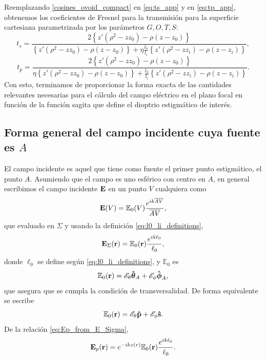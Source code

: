 Reemplazando \eqref{cosines_ovoid_compact} en \eqref{eq:ts_app} y en \eqref{eq:tp_app}, obtenemos los coeficientes de Fresnel para la transmisión para la superficie cartesiana parametrizada por los parámetros $G,O,T,S$:
\begin{equation}
 t_s
 =
 \frac{
 2 \left\{ z'(\rho^2 - zz_0) - \rho(z - z_0) \right\}
 }
 {
 \left\{ z'(\rho^2 - zz_0) - \rho(z - z_0) \right\}
 +
 \eta \frac{l_0}{l_i}
 \left\{ z'(\rho^2 - zz_i) - \rho(z - z_i) \right\}
 },
  \label{eq:t_s_ovoid}
\end{equation}
\begin{equation}
 t_p
 =
 \frac{
 2 \left\{ z'(\rho^2 - zz_0) - \rho(z - z_0) \right\}
 }
 {
 \eta
 \left\{ z'(\rho^2 - zz_0) - \rho(z - z_0) \right\}
 +
 \frac{l_0}{l_i}
 \left\{ z'(\rho^2 - zz_i) - \rho(z - z_i) \right\}
 }.
  \label{eq:t_p_ovoid}
\end{equation}
Con esto, terminamos de proporcionar la forma exacta de las cantidades relevantes necesarias para el cálculo del campo eléctrico en el plano focal en función de la función sagita que define el dioptrio estigmático de interés.

\subsection{Forma general del campo incidente cuya fuente es $A$}
\label{subsec:campo_incidente_fuente_A}

El campo incidente es aquel que tiene como fuente el primer punto estigmático, el punto $A$. Asumiendo que el campo es uno esférico con centro en $A$, en general escribimos el campo incidente $\vb E$ en un punto $V$ cualquiera como
\begin{equation}
  \vb E (V)
  =
  \mathbb{E}_0(V)
  \frac{e^{ik\overline{AV}}}{\overline{AV}},
  \label{eq:initial_field}
\end{equation}
que evaluado en $\Sigma$ y usando la definición \eqref{eq:l0_li_definitions},
\begin{equation}
  \vb E_\Sigma (\vb r)
  =
  \mathbb{E}_0(\vb r)
  \frac{e^{ik\ell_0}}{\ell_0},
  \label{eq:initial_field_sigma}
\end{equation}
donde $\ell_0$ se define según \eqref{eq:l0_li_definitions}, y $\mathbb E_0$ es
\begin{equation}
  \mathbb E_0 (\vb r)
  =
  \mathscr E_\theta \bm{\hat{\mathbf{\theta}}}_A
  +
  \mathscr E_\phi \bm{\hat{\mathbf{\phi}}}_A,
  \label{eq:mathbb_E_0_definition}
\end{equation}
que asegura que se cumpla la condición de transversalidad. De forma equivalente se escribe
\begin{equation}
  \mathbb E_0 (\vb r)
  =
  \mathscr E_\theta \bm{\hat{\mathbf{p}}}
  +
  \mathscr E_\phi \bm{\hat{\mathbf{s}}}.
  \label{eq:mathbb_E_0_definition_ps}
\end{equation}
De la relación \eqref{eq:Ep_from_E_Sigma},
\begin{equation}
  \vb E_p (\vb r)
  =
  e^{-ikz(r)}
  \mathbb{E}_0(\vb r)
  \frac{e^{ik\ell_0}}{\ell_0}.
  \label{eq:initial_field_in_p}
\end{equation}

